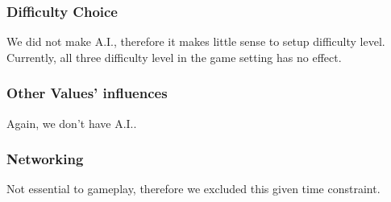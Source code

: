 \subsubsection{Difficulty Choice}
We did not make A.I., therefore it makes little sense to setup difficulty level. Currently, all three difficulty level in the game setting has no effect.

\subsubsection{Other Values' influences}
Again, we don't have A.I..

	\subsubsection{Networking}
		Not essential to gameplay, therefore we excluded this given time constraint.
	